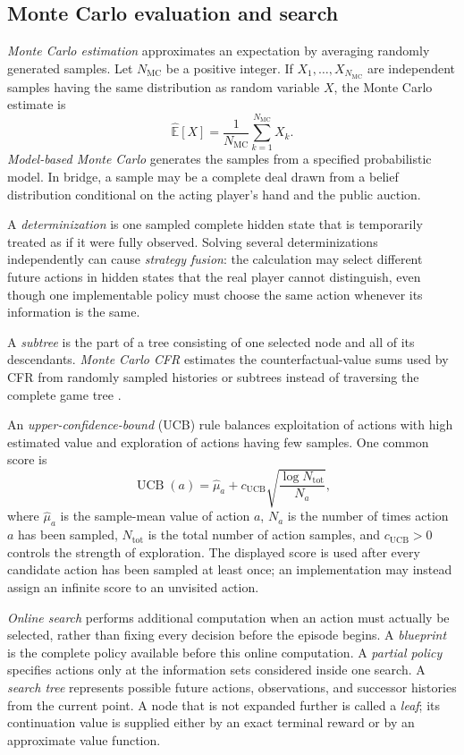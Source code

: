 \subsection{Monte Carlo evaluation and search}
\label{app:monte-carlo-search}

\emph{Monte Carlo estimation} approximates an expectation by averaging randomly generated samples. Let $N_{\mathrm{MC}}$ be a positive integer. If $X_1,\ldots,X_{N_{\mathrm{MC}}}$ are independent samples having the same distribution as random variable $X$, the Monte Carlo estimate is
\[
    \widehat{\mathbb{E}}[X]
    =
    \frac{1}{N_{\mathrm{MC}}}\sum_{k=1}^{N_{\mathrm{MC}}} X_k.
\]
\emph{Model-based Monte Carlo} generates the samples from a specified probabilistic model. In bridge, a sample may be a complete deal drawn from a belief distribution conditional on the acting player's hand and the public auction.

A \emph{determinization} is one sampled complete hidden state that is temporarily treated as if it were fully observed. Solving several determinizations independently can cause \emph{strategy fusion}: the calculation may select different future actions in hidden states that the real player cannot distinguish, even though one implementable policy must choose the same action whenever its information is the same.

A \emph{subtree} is the part of a tree consisting of one selected node and all of its descendants. \emph{Monte Carlo CFR} estimates the counterfactual-value sums used by CFR from randomly sampled histories or subtrees instead of traversing the complete game tree \cite{lanctot2009monte}.

An \emph{upper-confidence-bound} (UCB) rule balances exploitation of actions with high estimated value and exploration of actions having few samples. One common score is
\[
    \operatorname{UCB}(a)
    =
    \widehat\mu_a
    +
    c_{\mathrm{UCB}}\sqrt{\frac{\log N_{\mathrm{tot}}}{N_a}},
\]
where $\widehat\mu_a$ is the sample-mean value of action $a$, $N_a$ is the number of times action $a$ has been sampled, $N_{\mathrm{tot}}$ is the total number of action samples, and $c_{\mathrm{UCB}}>0$ controls the strength of exploration.
The displayed score is used after every candidate action has been sampled at least once; an implementation may instead assign an infinite score to an unvisited action.

\emph{Online search} performs additional computation when an action must actually be selected, rather than fixing every decision before the episode begins. A \emph{blueprint} is the complete policy available before this online computation. A \emph{partial policy} specifies actions only at the information sets considered inside one search. A \emph{search tree} represents possible future actions, observations, and successor histories from the current point. A node that is not expanded further is called a \emph{leaf}; its continuation value is supplied either by an exact terminal reward or by an approximate value function.

